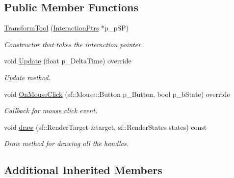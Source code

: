 \subsection*{Public Member Functions}
\begin{DoxyCompactItemize}
\item 
\mbox{\label{class_transform_tool_a0c5f3caf97efce149d18df2711512358}} 
\hyperlink{class_transform_tool_a0c5f3caf97efce149d18df2711512358}{Transform\+Tool} (\hyperlink{struct_interaction_ptrs}{Interaction\+Ptrs} $\ast$p\+\_\+p\+SP)
\begin{DoxyCompactList}\small\item\em Constructor that takes the interaction pointer. \end{DoxyCompactList}\item 
\mbox{\label{class_transform_tool_aa830f478b61f8de80a6edc8ecb8f2f0d}} 
void \hyperlink{class_transform_tool_aa830f478b61f8de80a6edc8ecb8f2f0d}{Update} (float p\+\_\+\+Delta\+Time) override
\begin{DoxyCompactList}\small\item\em Update method. \end{DoxyCompactList}\item 
\mbox{\label{class_transform_tool_a4716a3bdf7c72190fa7a09f64a94d58f}} 
void \hyperlink{class_transform_tool_a4716a3bdf7c72190fa7a09f64a94d58f}{On\+Mouse\+Click} (sf\+::\+Mouse\+::\+Button p\+\_\+\+Button, bool p\+\_\+b\+State) override
\begin{DoxyCompactList}\small\item\em Callback for mouse click event. \end{DoxyCompactList}\item 
\mbox{\label{class_transform_tool_a342c8e953914bf6c97d70eb5aa0accef}} 
void \hyperlink{class_transform_tool_a342c8e953914bf6c97d70eb5aa0accef}{draw} (sf\+::\+Render\+Target \&target, sf\+::\+Render\+States states) const
\begin{DoxyCompactList}\small\item\em Draw method for drawing all the handles. \end{DoxyCompactList}\end{DoxyCompactItemize}
\subsection*{Additional Inherited Members}


